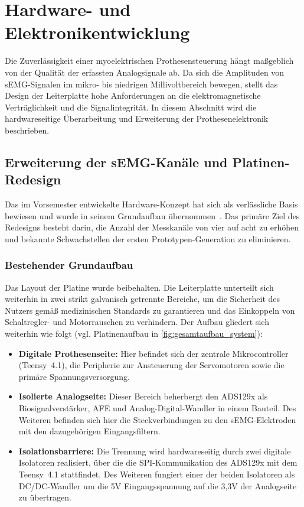 \section{Hardware- und Elektronikentwicklung}
\label{sec:hardware}
Die Zuverlässigkeit einer myoelektrischen Prothesensteuerung hängt maßgeblich von der Qualität der erfassten Analogsignale ab. Da sich die Amplituden von \ac{sEMG}-Signalen im mikro- bis niedrigen Millivoltbereich bewegen, stellt das Design der Leiterplatte hohe Anforderungen an die elektromagnetische Verträglichkeit und die Signalintegrität. In diesem Abschnitt wird die hardwareseitige Überarbeitung und Erweiterung der Prothesenelektronik beschrieben.
    \subsection{Erweiterung der sEMG-Kanäle und Platinen-Redesign}
    Das im Vorsemester entwickelte Hardware-Konzept hat sich als verlässliche Basis bewiesen und wurde in seinem Grundaufbau übernommen~\cite{ZeitlerLaubhan2026}. Das primäre Ziel des Redesigns besteht darin, die Anzahl der Messkanäle von vier auf acht zu erhöhen und bekannte Schwachstellen der ersten Prototypen-Generation zu eliminieren. 
        \subsubsection{Bestehender Grundaufbau}
        Das Layout der Platine wurde beibehalten. Die Leiterplatte unterteilt sich weiterhin in zwei strikt galvanisch getrennte Bereiche, um die Sicherheit des Nutzers gemäß medizinischen Standards zu garantieren und das Einkoppeln von Schaltregler- und Motorrauschen zu verhindern. Der Aufbau gliedert sich weiterhin wie folgt (vgl. Platinenaufbau in \autoref{fig:gesamtaufbau_system}):
        \begin{itemize}
            \item \textbf{Digitale Prothesenseite:} Hier befindet sich der zentrale Mikrocontroller (\textsf{Teensy~4.1}), die Peripherie zur Ansteuerung der Servomotoren sowie die primäre Spannungsversorgung.
            \item \textbf{Isolierte Analogseite:} Dieser Bereich beherbergt den \textsf{ADS129x} als Biosignalverstärker, \ac{AFE} und Analog-Digital-Wandler in einem Bauteil. Des Weiteren befinden sich hier die Steckverbindungen zu den \ac{sEMG}-Elektroden mit den dazugehörigen Eingangsfiltern.
            \item \textbf{Isolationsbarriere:} Die Trennung wird hardwareseitig durch zwei digitale Isolatoren realisiert, über die die SPI-Kommunikation des \textsf{ADS129x} mit dem \textsf{Teensy~4.1} stattfindet. Des Weiteren fungiert einer der beiden Isolatoren als DC/DC-Wandler um die 5V Eingangsspannung auf die 3,3V der Analogseite zu übertragen.
        \end{itemize}

